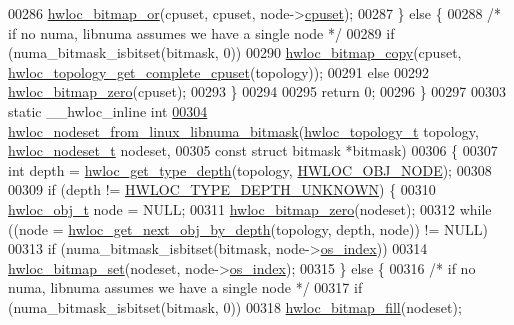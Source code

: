 \begin{DoxyCode}
00286         \hyperlink{a00065_ga1ba1de709ee9a7cf5cc8ad2d9a1a81d4}{hwloc_bitmap_or}(cpuset, cpuset, node->\hyperlink{a00016_a67925e0f2c47f50408fbdb9bddd0790f}{cpuset});
00287   \} \textcolor{keywordflow}{else} \{
00288     \textcolor{comment}{/* if no numa, libnuma assumes we have a single node */}
00289     \textcolor{keywordflow}{if} (numa\_bitmask\_isbitset(bitmask, 0))
00290       \hyperlink{a00065_gab14743355fa03b36cef521cbcd2fbf64}{hwloc_bitmap_copy}(cpuset, \hyperlink{a00060_ga418ebb39eaf1eac8f9cf4047cf59a534}{hwloc_topology_get_complete_cpuset}(topology));
00291     \textcolor{keywordflow}{else}
00292       \hyperlink{a00065_ga6c540b9fe63b8223b6aba46d56dd63b8}{hwloc_bitmap_zero}(cpuset);
00293   \}
00294 
00295   \textcolor{keywordflow}{return} 0;
00296 \}
00297 
00303 \textcolor{keyword}{static} \_\_hwloc\_inline \textcolor{keywordtype}{int}
\hypertarget{a00034_source_l00304}{}\hyperlink{a00069_ga5a1d17375cc7b65cd155330008cbdb6a}{00304} \hyperlink{a00069_ga5a1d17375cc7b65cd155330008cbdb6a}{hwloc_nodeset_from_linux_libnuma_bitmask}(\hyperlink{a00039_ga9d1e76ee15a7dee158b786c30b6a6e38}{hwloc_topology_t} topology, 
      \hyperlink{a00040_ga37e35730fa7e775b5bb0afe893d6d508}{hwloc_nodeset_t} nodeset,
00305                                          \textcolor{keyword}{const} \textcolor{keyword}{struct} bitmask *bitmask)
00306 \{
00307   \textcolor{keywordtype}{int} depth = \hyperlink{a00046_gaea7c64dd59467f5201ba87712710b14d}{hwloc_get_type_depth}(topology, \hyperlink{a00041_ggacd37bb612667dc437d66bfb175a8dc55aaf0964881117bdedf1a5e9332cd120dd}{HWLOC_OBJ_NODE});
00308 
00309   \textcolor{keywordflow}{if} (depth != \hyperlink{a00046_ggaf4e663cf42bbe20756b849c6293ef575a0565ab92ab72cb0cec91e23003294aad}{HWLOC_TYPE_DEPTH_UNKNOWN}) \{
00310     \hyperlink{a00016}{hwloc_obj_t} node = NULL;
00311     \hyperlink{a00065_ga6c540b9fe63b8223b6aba46d56dd63b8}{hwloc_bitmap_zero}(nodeset);
00312     \textcolor{keywordflow}{while} ((node = \hyperlink{a00053_gab7c1dce3f42ece5bfa621e87cf332418}{hwloc_get_next_obj_by_depth}(topology, depth, node)) != NULL)
00313       \textcolor{keywordflow}{if} (numa\_bitmask\_isbitset(bitmask, node->\hyperlink{a00016_a61a7a80a68eaccbaaa28269e678c81a9}{os_index}))
00314         \hyperlink{a00065_ga497556af0cc34f109ae0277999c074d3}{hwloc_bitmap_set}(nodeset, node->\hyperlink{a00016_a61a7a80a68eaccbaaa28269e678c81a9}{os_index});
00315   \} \textcolor{keywordflow}{else} \{
00316     \textcolor{comment}{/* if no numa, libnuma assumes we have a single node */}
00317     \textcolor{keywordflow}{if} (numa\_bitmask\_isbitset(bitmask, 0))
00318       \hyperlink{a00065_ga52456f7ef79d68e610cb65e3f7ffafad}{hwloc_bitmap_fill}(nodeset);

\end{DoxyCode}
